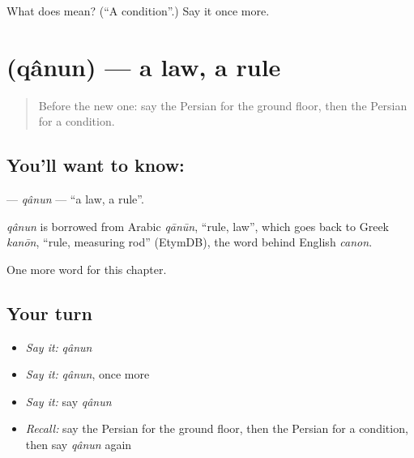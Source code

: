 \begin{tcolorbox}[breakable,colback=teal!4,colframe=teal!35!black,title={Before you move on}]
What does  mean? (\textquotedblleft{}A condition\textquotedblright{}.) Say it once more.
\end{tcolorbox}
\section[\texorpdfstring{\fa{قانون} (qânun)}{قانون (qânun)}]{ (qânun) — a law, a rule}

\label{lesson:FA-C197-qanun}



\begin{quote}
Before the new one: say the Persian for the ground floor, then the Persian for a condition.
\end{quote}

\subsection*{You'll want to know: }
\textbf{} — \emph{qânun} — \textquotedblleft{}a law, a rule\textquotedblright{}.

\begin{cousinweb}
\emph{qânun} is borrowed from Arabic \emph{qānūn}, \textquotedblleft{}rule, law\textquotedblright{}, which goes back to Greek \emph{kanōn}, \textquotedblleft{}rule, measuring rod\textquotedblright{} (EtymDB), the word behind English \emph{canon}.
\end{cousinweb}

\begin{grammarlens}[title={What you've built}]
One more word for this chapter.
\end{grammarlens}

\subsection*{Your turn}
\begin{itemize}
\raggedright
  \item \emph{Say it:} \emph{qânun}
  \item \emph{Say it:} \emph{qânun}, once more
  \item \emph{Say it:} say \emph{qânun}
  \item \emph{Recall:} say the Persian for the ground floor, then the Persian for a condition, then say \emph{qânun} again
\end{itemize}

